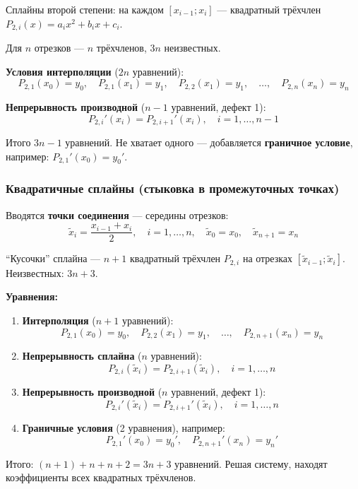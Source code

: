 \documentclass[14pt,a4paper]{extarticle}
\begin{document}
Сплайны второй степени: на каждом $[x_{i-1}; x_i]$ --- квадратный трёхчлен $P_{2,i}(x) = a_i x^2 + b_i x + c_i$.

Для $n$ отрезков --- $n$ трёхчленов, $3n$ неизвестных.

\textbf{Условия интерполяции} ($2n$ уравнений):
\[P_{2,1}(x_0) = y_0, \quad P_{2,1}(x_1) = y_1, \quad P_{2,2}(x_1) = y_1, \quad \ldots, \quad P_{2,n}(x_n) = y_n\]

\textbf{Непрерывность производной} ($n-1$ уравнений, дефект 1):
\[P_{2,i}'(x_i) = P_{2,i+1}'(x_i), \quad i = 1, \ldots, n-1\]

Итого $3n - 1$ уравнений. Не хватает одного --- добавляется \textbf{граничное условие}, например: $P_{2,1}'(x_0) = y_0'$.

\subsubsection{Квадратичные сплайны (стыковка в промежуточных точках)}

Вводятся \textbf{точки соединения} --- середины отрезков:
\[\tilde{x}_i = \frac{x_{i-1} + x_i}{2}, \quad i = 1, \ldots, n, \quad \tilde{x}_0 = x_0, \quad \tilde{x}_{n+1} = x_n\]

``Кусочки'' сплайна --- $n+1$ квадратный трёхчлен $P_{2,i}$ на отрезках $[\tilde{x}_{i-1}; \tilde{x}_i]$. Неизвестных: $3n + 3$.

\textbf{Уравнения:}

\begin{enumerate}
    \item \textbf{Интерполяция} ($n+1$ уравнений):
    \[P_{2,1}(x_0) = y_0, \quad P_{2,2}(x_1) = y_1, \quad \ldots, \quad P_{2,n+1}(x_n) = y_n\]

    \item \textbf{Непрерывность сплайна} ($n$ уравнений):
    \[P_{2,i}(\tilde{x}_i) = P_{2,i+1}(\tilde{x}_i), \quad i = 1, \ldots, n\]

    \item \textbf{Непрерывность производной} ($n$ уравнений, дефект 1):
    \[P_{2,i}'(\tilde{x}_i) = P_{2,i+1}'(\tilde{x}_i), \quad i = 1, \ldots, n\]

    \item \textbf{Граничные условия} (2 уравнения), например:
    \[P_{2,1}'(x_0) = y_0', \quad P_{2,n+1}'(x_n) = y_n'\]
\end{enumerate}

Итого: $(n+1) + n + n + 2 = 3n + 3$ уравнений. Решая систему, находят коэффициенты всех квадратных трёхчленов.
\end{document}
